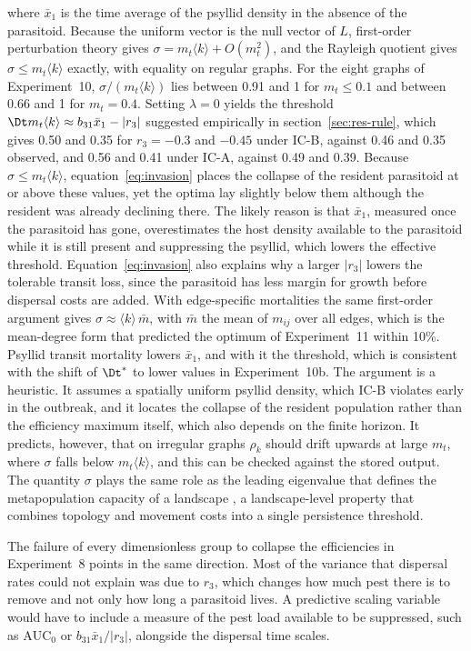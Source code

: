 where $\bar{x}_1$ is the time average of the psyllid density in the absence of the parasitoid. Because the uniform vector is the null vector of $L$, first-order perturbation theory gives $\sigma = m_t\langle k\rangle + O(m_t^2)$, and the Rayleigh quotient gives $\sigma \le m_t\langle k\rangle$ exactly, with equality on regular graphs. For the eight graphs of Experiment~10, $\sigma/(m_t\langle k\rangle)$ lies between 0.91 and 1 for $m_t \le 0.1$ and between 0.66 and 1 for $m_t = 0.4$. Setting $\lambda = 0$ yields the threshold $\Dt m_t \langle k\rangle \approx b_{31}\bar{x}_1 - |r_3|$ suggested empirically in section~\ref{sec:res-rule}, which gives 0.50 and 0.35 for $r_3 = -0.3$ and $-0.45$ under IC-B, against 0.46 and 0.35 observed, and 0.56 and 0.41 under IC-A, against 0.49 and 0.39. Because $\sigma \le m_t\langle k\rangle$, equation~\eqref{eq:invasion} places the collapse of the resident parasitoid at or above these values, yet the optima lay slightly below them although the resident was already declining there. The likely reason is that $\bar{x}_1$, measured once the parasitoid has gone, overestimates the host density available to the parasitoid while it is still present and suppressing the psyllid, which lowers the effective threshold. Equation~\eqref{eq:invasion} also explains why a larger $|r_3|$ lowers the tolerable transit loss, since the parasitoid has less margin for growth before dispersal costs are added. With edge-specific mortalities the same first-order argument gives $\sigma \approx \langle k\rangle\,\bar{m}$, with $\bar{m}$ the mean of $m_{ij}$ over all edges, which is the mean-degree form that predicted the optimum of Experiment~11 within 10\%. Psyllid transit mortality lowers $\bar{x}_1$, and with it the threshold, which is consistent with the shift of $\Dt^*$ to lower values in Experiment~10b. The argument is a heuristic. It assumes a spatially uniform psyllid density, which IC-B violates early in the outbreak, and it locates the collapse of the resident population rather than the efficiency maximum itself, which also depends on the finite horizon. It predicts, however, that on irregular graphs $\rho_k$ should drift upwards at large $m_t$, where $\sigma$ falls below $m_t\langle k\rangle$, and this can be checked against the stored output. The quantity $\sigma$ plays the same role as the leading eigenvalue that defines the metapopulation capacity of a landscape \citep{hanski2000}, a landscape-level property that combines topology and movement costs into a single persistence threshold.

The failure of every dimensionless group to collapse the efficiencies in Experiment~8 points in the same direction. Most of the variance that dispersal rates could not explain was due to $r_3$, which changes how much pest there is to remove and not only how long a parasitoid lives. A predictive scaling variable would have to include a measure of the pest load available to be suppressed, such as $\mathrm{AUC}_0$ or $b_{31}\bar{x}_1/|r_3|$, alongside the dispersal time scales.

